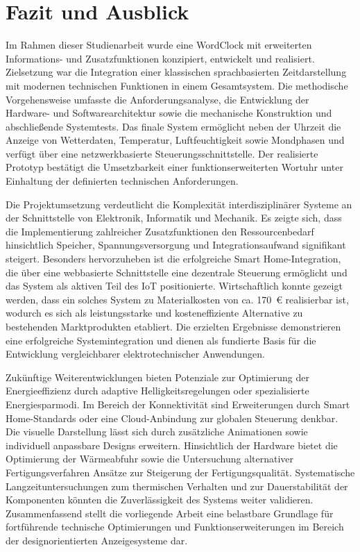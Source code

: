 \chapter{Fazit und Ausblick}
Im Rahmen dieser Studienarbeit wurde eine WordClock mit erweiterten Informations- und Zusatzfunktionen konzipiert, entwickelt und realisiert. 
Zielsetzung war die Integration einer klassischen sprachbasierten Zeitdarstellung mit modernen technischen Funktionen in einem Gesamtsystem. 
Die methodische Vorgehensweise umfasste die Anforderungsanalyse, die Entwicklung der Hardware- und Softwarearchitektur sowie die mechanische Konstruktion und abschließende Systemtests. 
Das finale System ermöglicht neben der Uhrzeit die Anzeige von Wetterdaten, Temperatur, Luftfeuchtigkeit sowie Mondphasen und verfügt über eine netzwerkbasierte Steuerungsschnittstelle. 
Der realisierte Prototyp bestätigt die Umsetzbarkeit einer funktionserweiterten Wortuhr unter Einhaltung der definierten technischen Anforderungen.

Die Projektumsetzung verdeutlicht die Komplexität interdisziplinärer Systeme an der Schnittstelle von Elektronik, Informatik und Mechanik. 
Es zeigte sich, dass die Implementierung zahlreicher Zusatzfunktionen den Ressourcenbedarf hinsichtlich Speicher, Spannungsversorgung und Integrationsaufwand signifikant steigert. 
Besonders hervorzuheben ist die erfolgreiche Smart Home-Integration, die über eine webbasierte Schnittstelle eine dezentrale Steuerung ermöglicht und das System als aktiven Teil des IoT positionierte. 
Wirtschaftlich konnte gezeigt werden, dass ein solches System zu Materialkosten von ca. 170~€ realisierbar ist, wodurch es sich als leistungsstarke und kosteneffiziente Alternative zu bestehenden Marktprodukten etabliert. 
Die erzielten Ergebnisse demonstrieren eine erfolgreiche Systemintegration und dienen als fundierte Basis für die Entwicklung vergleichbarer elektrotechnischer Anwendungen.

Zukünftige Weiterentwicklungen bieten Potenziale zur Optimierung der Energieeffizienz durch adaptive Helligkeitsregelungen oder spezialisierte Energiesparmodi. 
Im Bereich der Konnektivität sind Erweiterungen durch Smart Home-Standards oder eine Cloud-Anbindung zur globalen Steuerung denkbar. 
Die visuelle Darstellung lässt sich durch zusätzliche Animationen sowie individuell anpassbare Designs erweitern. 
Hinsichtlich der Hardware bietet die Optimierung der Wärmeabfuhr sowie die Untersuchung alternativer Fertigungsverfahren Ansätze zur Steigerung der Fertigungsqualität. 
Systematische Langzeituntersuchungen zum thermischen Verhalten und zur Dauerstabilität der Komponenten könnten die Zuverlässigkeit des Systems weiter validieren. 
Zusammenfassend stellt die vorliegende Arbeit eine belastbare Grundlage für fortführende technische Optimierungen und Funktionserweiterungen im Bereich der designorientierten Anzeigesysteme dar.
